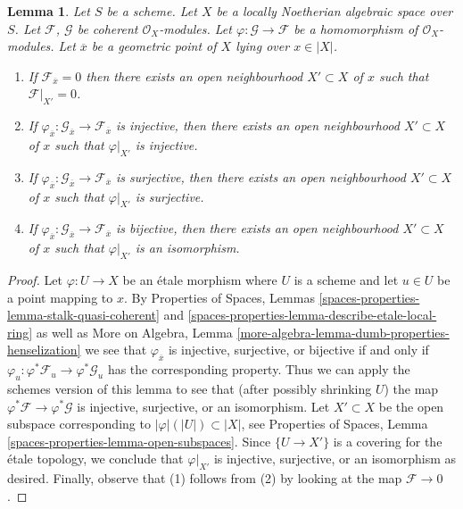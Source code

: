 \documentclass{stacks-project}
\theoremstyle{plain}
\newtheorem{lemma}[subsection]{Lemma}
\theoremstyle{definition}
\theoremstyle{remark}
\numberwithin{equation}{subsection}
\begin{document}
\begin{lemma}
\label{lemma-local-isomorphism}
Let $S$ be a scheme. Let $X$ be a locally Noetherian algebraic space over $S$.
Let $\mathcal{F}$, $\mathcal{G}$ be coherent $\mathcal{O}_X$-modules.
Let $\varphi : \mathcal{G} \to \mathcal{F}$ be a homomorphism
of $\mathcal{O}_X$-modules. Let $\overline{x}$ be a geometric point of $X$
lying over $x \in |X|$.
\begin{enumerate}
\item If $\mathcal{F}_{\overline{x}} = 0$ then there exists an open
neighbourhood $X' \subset X$ of $x$ such that $\mathcal{F}|_{X'} = 0$.
\item If $\varphi_{\overline{x}} : \mathcal{G}_{\overline{x}} \to
\mathcal{F}_{\overline{x}}$ is injective, then there exists an open
neighbourhood $X' \subset X$ of $x$ such that $\varphi|_{X'}$ is injective.
\item If $\varphi_{\overline{x}} : \mathcal{G}_{\overline{x}} \to
\mathcal{F}_{\overline{x}}$ is surjective, then there exists an open
neighbourhood $X' \subset X$ of $x$ such that $\varphi|_{X'}$ is surjective.
\item If $\varphi_{\overline{x}} : \mathcal{G}_{\overline{x}} \to
\mathcal{F}_{\overline{x}}$ is bijective, then there exists an open
neighbourhood $X' \subset X$ of $x$ such that $\varphi|_{X'}$ is an isomorphism.
\end{enumerate}
\end{lemma}

\begin{proof}
Let $\varphi : U \to X$ be an \'etale morphism where $U$ is a scheme and
let $u \in U$ be a point mapping to $x$. By
Properties of Spaces, Lemmas
\ref{spaces-properties-lemma-stalk-quasi-coherent} and
\ref{spaces-properties-lemma-describe-etale-local-ring}
as well as
More on Algebra, Lemma \ref{more-algebra-lemma-dumb-properties-henselization}
we see that $\varphi_{\overline{x}}$ is injective, surjective, or bijective
if and only if $\varphi_u : \varphi^*\mathcal{F}_u \to \varphi^*\mathcal{G}_u$
has the corresponding property. Thus we can apply the schemes version of
this lemma to see that (after possibly shrinking $U$) the map
$\varphi^*\mathcal{F} \to \varphi^*\mathcal{G}$ is injective, surjective,
or an isomorphism. Let $X' \subset X$ be the open subspace corresponding
to $|\varphi|(|U|) \subset |X|$, see
Properties of Spaces, Lemma \ref{spaces-properties-lemma-open-subspaces}.
Since $\{U \to X'\}$ is a covering for the \'etale topology, we conclude
that $\varphi|_{X'}$ is injective, surjective, or an isomorphism as desired.
Finally, observe that (1) follows from (2) by looking at the map
$\mathcal{F} \to 0$.
\end{proof}
\end{document}
